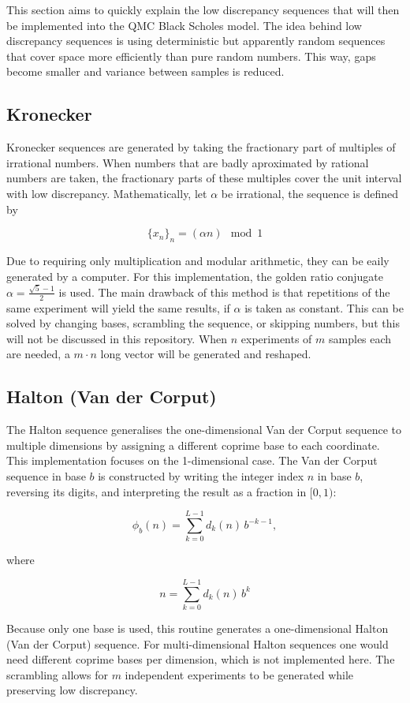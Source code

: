 \documentclass[11pt,oneside,parskip=half]{scrbook}  %
\begin{document}
This section aims to quickly explain the low discrepancy sequences that will then be implemented into the QMC Black Scholes model. The idea behind low discrepancy sequences is using deterministic but apparently random sequences that cover space more efficiently than pure random numbers. This way, gaps become smaller and variance between samples is reduced.

\subsection{Kronecker}

Kronecker sequences are generated by taking the fractionary part of multiples of irrational numbers. When numbers that are badly aproximated by rational numbers are taken, the fractionary parts of these multiples cover the unit interval with low discrepancy. Mathematically, let $\alpha$ be irrational, the sequence is defined by

$$
\{x_n\}_n=(\alpha n)\mod 1
$$

Due to requiring only multiplication and modular arithmetic, they can be eaily generated by a computer. For this implementation, the golden ratio conjugate $\alpha=\frac{\sqrt5-1}2$ is used. The main drawback of this method is that repetitions of the same experiment will yield the same results, if $\alpha$ is taken as constant. This can be solved by changing bases, scrambling the sequence, or skipping numbers, but this will not be discussed in this repository. When $n$ experiments of $m$ samples each are needed, a $m·n$ long vector will be generated and reshaped.

\subsection{Halton (Van der Corput)}

The Halton sequence generalises the one-dimensional Van der Corput sequence to multiple dimensions by assigning a different coprime base to each coordinate. This implementation focuses on the 1-dimensional case. The Van der Corput sequence in base $b$ is constructed by writing the integer index $n$ in base $b$, reversing its digits, and interpreting the result as a fraction in $[0,1)$:

$$
\phi_b(n) = \sum_{k=0}^{L-1} d_k(n) \, b^{-k-1},
$$

where

$$
n = \sum_{k=0}^{L-1} d_k(n) \, b^k
$$

Because only one base is used, this routine generates a one-dimensional Halton (Van der Corput) sequence. For multi-dimensional Halton sequences one would need different coprime bases per dimension, which is not implemented here. The scrambling allows for $m$ independent experiments to be generated while preserving low discrepancy.
\end{document}
